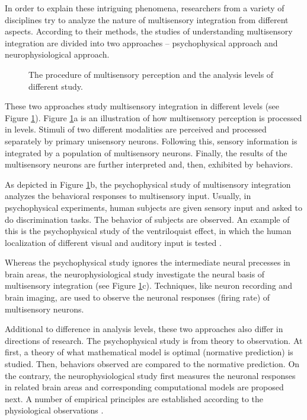 \documentclass{article}[11pt]
\newcommand{\inputTikZ}[1]{%
}
\begin{document}
In order to explain these intriguing phenomena, researchers from a variety of disciplines try to analyze the nature of multisensory integration from different aspects. According to their methods, the studies of understanding multisensory integration are divided into two approaches -- psychophysical approach and neurophysiological approach.

\begin{figure}[tpb]
  \centering \inputTikZ{flow}
  \caption{The procedure of multisensory perception and the analysis levels of different study.}
  \label{fig:flow}
\end{figure}

These two approaches study multisensory integration in different levels (see Figure \ref{fig:flow}).
Figure \ref{fig:flow}a is an illustration of how multisensory perception is processed in levels. Stimuli of two different modalities are perceived and processed separately by primary unisensory neurons. Following this, sensory information is integrated by a population of multisensory neurons. Finally, the results of the multisensory neurons are further interpreted and, then, exhibited by behaviors.

As depicted in Figure \ref{fig:flow}b, the psychophysical study of multisensory integration analyzes the behavioral responses to multisensory input. Usually, in psychophysical experiments, human subjects are given sensory input and asked to do discrimination tasks. The behavior of subjects are observed. An example of this is the psychophysical study of the ventriloquist effect, in which the human localization of different visual and auditory input is tested \cite{alais_ventriloquist_2004}.

Whereas the psychophysical study ignores the intermediate neural precesses in brain areas, the neurophysiological study investigate the neural basis of multisensory integration (see Figure \ref{fig:flow}c). Techniques, like neuron recording and brain imaging, are used to observe the neuronal responses (firing rate) of multisensory neurons.

Additional to difference in analysis levels, these two approaches also differ in directions of research. The psychophysical study is from theory to observation. At first, a theory of what mathematical model is optimal (normative prediction) is studied. Then, behaviors observed are compared to the normative prediction. On the contrary, the neurophysiological study first measures the neuronal responses in related brain areas and corresponding computational models are proposed next. A number of empirical principles are established according to the physiological observations \cite{stein_merging_1993, stanford_evaluating_2005}.
\end{document}
